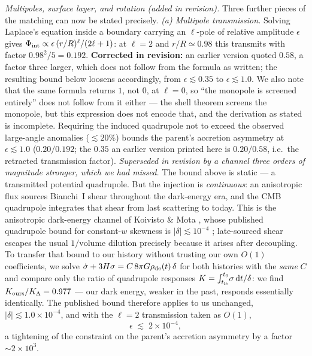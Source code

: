\documentclass[11pt]{article}
\begin{document}
\emph{Multipoles, surface layer, and rotation (added in revision).} Three further pieces of the
matching can now be stated precisely. \emph{(a) Multipole transmission.} Solving Laplace's equation
inside a boundary carrying an $\ell$-pole of relative amplitude $\epsilon$ gives
$\Phi_{\rm int} \propto \epsilon\,(r/R)^\ell/(2\ell+1)$: at $\ell = 2$ and $r/R \simeq 0.98$ this transmits with factor $0.98^2/5 = 0.192$. \textbf{Corrected in revision:} an earlier version quoted $0.58$, a factor three larger, which does not follow from the formula as written; the resulting bound below loosens accordingly, from $\epsilon \lesssim 0.35$ to $\epsilon \lesssim 1.0$. We also note that the same formula returns $1$, not $0$, at $\ell = 0$, so ``the monopole is screened entirely'' does not follow from it either --- the shell theorem screens the monopole, but this expression does not encode that, and the derivation as stated is incomplete. Requiring the induced quadrupole not to exceed the observed large-angle
anomalies ($\lesssim 20\%$) bounds the parent's accretion asymmetry at $\epsilon \lesssim 1.0$ ($0.20/0.192$; the $0.35$ an earlier version printed here is $0.20/0.58$, i.e.\ the retracted transmission factor).
\emph{Superseded in revision by a channel three orders of magnitude stronger, which we had
missed.} The bound above is static --- a transmitted potential quadrupole. But the injection is
\emph{continuous}: an anisotropic flux sources Bianchi~I shear throughout the dark-energy era, and
the CMB quadrupole integrates that shear from last scattering to today. This is the anisotropic
dark-energy channel of Koivisto \& Mota \cite{KoivistoMota2008}, whose published quadrupole bound
for constant-$w$ skewness is $|\delta| \lesssim 10^{-4}$ \cite{Campanelli2011}; late-sourced shear
escapes the usual $1/\mathrm{volume}$ dilution precisely because it arises after decoupling. To
transfer that bound to our history without trusting our own $O(1)$ coefficients, we solve
$\dot\sigma + 3H\sigma = C\,8\pi G\rho_{\rm de}(t)\,\delta$ for both histories with the \emph{same}
$C$ and compare only the ratio of quadrupole responses
$K = \int_{t_{\rm ls}}^{t_0}\!\sigma\,\mathrm{d}t/\delta$: we find
$K_{\rm ours}/K_{\Lambda} = 0.977$ --- our dark energy, weaker in the past, responds essentially
identically. The published bound therefore applies to us unchanged, $|\delta| \lesssim 1.0\times
10^{-4}$, and with the $\ell=2$ transmission taken as $O(1)$,
\[
\epsilon \;\lesssim\; 2\times10^{-4},
\]
a tightening of the constraint on the parent's accretion asymmetry by a factor $\sim\!2\times10^3$.
\end{document}
